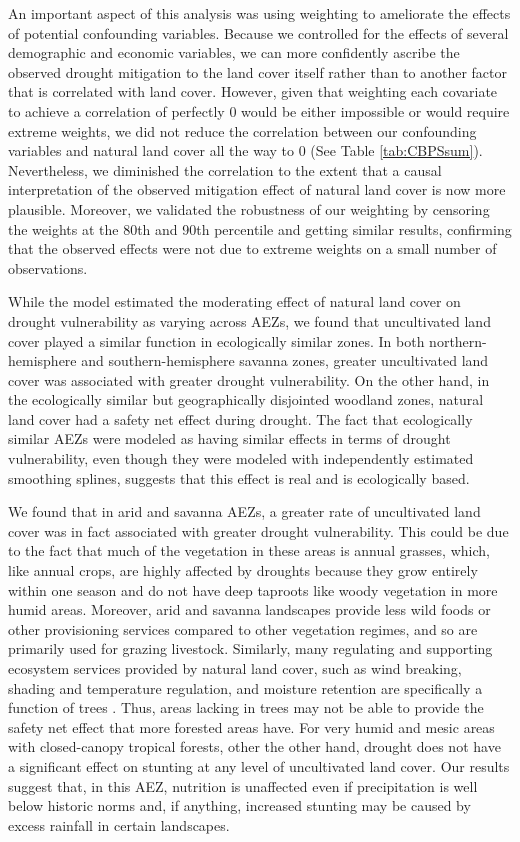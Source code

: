\documentclass{article}
\begin{document}
An important aspect of this analysis was using weighting to ameliorate the effects of potential confounding variables.  Because we controlled for the effects of several demographic and economic variables, we can more confidently ascribe the observed drought mitigation to the land cover itself rather than to another factor that is correlated with land cover.  However, given that weighting each covariate to achieve a correlation of perfectly 0 would be either impossible or would require extreme weights, we did not reduce the correlation between our confounding variables and natural land cover all the way to 0 (See Table \ref{tab:CBPSsum}).  Nevertheless, we diminished the correlation to the extent that a causal interpretation of the observed mitigation effect of natural land cover is now more plausible. Moreover, we validated the robustness of our weighting by censoring the weights at the 80th and 90th percentile and getting similar results, confirming that the observed effects were not due to extreme weights on a small number of observations.

While the model estimated the moderating effect of natural land cover on drought vulnerability as varying across AEZs, we found that uncultivated land cover played a similar function in ecologically similar zones.  In both northern-hemisphere and southern-hemisphere savanna zones, greater uncultivated land cover was associated with greater drought vulnerability.  On the other hand, in the ecologically similar but geographically disjointed woodland zones, natural land cover had a safety net effect during drought.  The fact that ecologically similar AEZs were modeled as having similar effects in terms of drought vulnerability, even though they were modeled with independently estimated smoothing splines, suggests that this effect is real and is ecologically based.

We found that in arid and savanna AEZs, a greater rate of uncultivated land cover was in fact associated with greater drought vulnerability.  This could be due to the fact that much of the vegetation in these areas is annual grasses, which, like annual crops, are highly affected by droughts because they grow entirely within one season and do not have deep taproots like woody vegetation in more humid areas.  Moreover, arid and savanna landscapes provide less wild foods or other provisioning services compared to other vegetation regimes, and so are primarily used for grazing livestock.  Similarly, many regulating and supporting ecosystem services provided by natural land cover, such as wind breaking, shading and temperature regulation, and moisture retention are specifically a function of trees \cite{Reed2016}.  Thus, areas lacking in trees may not be able to provide the safety net effect that more forested areas have.  For very humid and mesic areas with closed-canopy tropical forests, other the other hand, drought does not have a significant effect on stunting at any level of uncultivated land cover.  Our results suggest that, in this AEZ, nutrition is unaffected even if precipitation is well below historic norms and, if anything, increased stunting may be caused by excess rainfall in certain landscapes.
\end{document}
